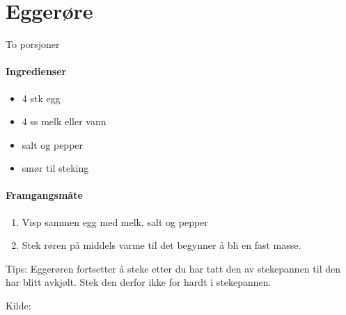 \section{﻿Eggerøre}
To porsjoner

\paragraph{Ingredienser}
\begin{itemize}[noitemsep]
	\item 4 stk egg
	\item 4 ss melk eller vann
	\item salt og pepper
	\item smør til steking
\end{itemize}

\paragraph{Framgangsmåte}
\begin{enumerate}[noitemsep]
	\item Visp sammen egg med melk, salt og pepper
	\item Stek røren på middels varme til det begynner å bli en fast masse.
\end{enumerate}

Tips: Eggerøren fortsetter å steke etter du har tatt den av stekepannen til den har blitt avkjølt. Stek den derfor ikke for hardt i stekepannen.

Kilde: \href{http://www.matprat.no/sunn/sunne-oppskrifter/sunne-oppskrifter-god-samvittighet/eggerore/}{}
